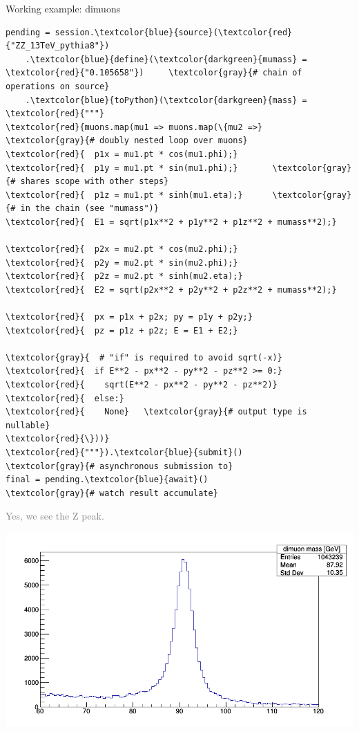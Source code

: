 \documentclass{beamer}
\begin{document}
\begin{frame}[fragile]{Working example: dimuons}
\vspace{0.15 cm}
\scriptsize
\begin{Verbatim}[commandchars=\\\{\}]
pending = session.\textcolor{blue}{source}(\textcolor{red}{"ZZ_13TeV_pythia8"})
    .\textcolor{blue}{define}(\textcolor{darkgreen}{mumass} = \textcolor{red}{"0.105658"})     \textcolor{gray}{# chain of operations on source}
    .\textcolor{blue}{toPython}(\textcolor{darkgreen}{mass} = \textcolor{red}{"""}
\textcolor{red}{muons.map(mu1 => muons.map(\{mu2 =>}   \textcolor{gray}{# doubly nested loop over muons}
\textcolor{red}{  p1x = mu1.pt * cos(mu1.phi);}
\textcolor{red}{  p1y = mu1.pt * sin(mu1.phi);}       \textcolor{gray}{# shares scope with other steps}
\textcolor{red}{  p1z = mu1.pt * sinh(mu1.eta);}      \textcolor{gray}{# in the chain (see "mumass")}
\textcolor{red}{  E1 = sqrt(p1x**2 + p1y**2 + p1z**2 + mumass**2);}

\textcolor{red}{  p2x = mu2.pt * cos(mu2.phi);}
\textcolor{red}{  p2y = mu2.pt * sin(mu2.phi);}
\textcolor{red}{  p2z = mu2.pt * sinh(mu2.eta);}
\textcolor{red}{  E2 = sqrt(p2x**2 + p2y**2 + p2z**2 + mumass**2);}

\textcolor{red}{  px = p1x + p2x; py = p1y + p2y;}
\textcolor{red}{  pz = p1z + p2z; E = E1 + E2;}

\textcolor{gray}{  # "if" is required to avoid sqrt(-x)}
\textcolor{red}{  if E**2 - px**2 - py**2 - pz**2 >= 0:}
\textcolor{red}{    sqrt(E**2 - px**2 - py**2 - pz**2)}
\textcolor{red}{  else:}
\textcolor{red}{    None}   \textcolor{gray}{# output type is nullable}
\textcolor{red}{\}))}
\textcolor{red}{"""}).\textcolor{blue}{submit}()                        \textcolor{gray}{# asynchronous submission to}
final = pending.\textcolor{blue}{await}()              \textcolor{gray}{# watch result accumulate}
\end{Verbatim}

\vspace{-4 cm}
\hfill \textcolor{gray}{Yes, we see the Z peak.\hspace{0.25 cm}}

\vspace{-0.2 cm}
\hfill \mbox{\includegraphics[width=0.48\linewidth]{c1.png}\hspace{-1 cm}}
\vspace{4 cm}
\end{frame}
\end{document}

